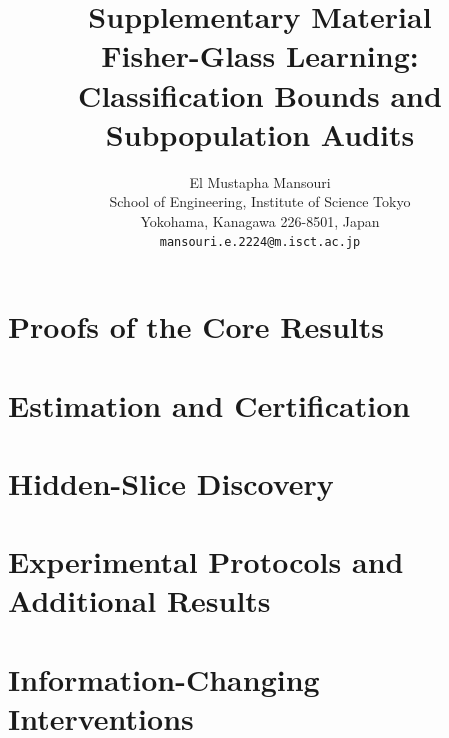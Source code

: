 \documentclass{article}
\title{Supplementary Material\\[0.25em]\large Fisher-Glass Learning: Classification Bounds and Subpopulation Audits}
\author{%
  El Mustapha Mansouri \\
  School of Engineering, Institute of Science Tokyo \\
  Yokohama, Kanagawa 226-8501, Japan \\
  \texttt{mansouri.e.2224@m.isct.ac.jp}
}
\begin{document}
\maketitle

\clearpage
\appendix
\raggedbottom
\makeatletter
\setlength{\@fptop}{0pt}
\makeatother
{}
\renewcommand{\theHfigure}{supp.\thesection.\arabic{figure}}
\renewcommand{\theHtable}{supp.\thesection.\arabic{table}}

\section{Proofs of the Core Results}
\label{app:core-proofs}


\section{Estimation and Certification}
\label{app:estimation-certification}

\FloatBarrier

\section{Hidden-Slice Discovery}
\label{app:hidden-slice-discovery}

\FloatBarrier

\clearpage
\section{Experimental Protocols and Additional Results}
\label{app:experimental-details}


\FloatBarrier

\clearpage
\section{Information-Changing Interventions}
\label{app:information-interventions}


\FloatBarrier

\clearpage
\end{document}
